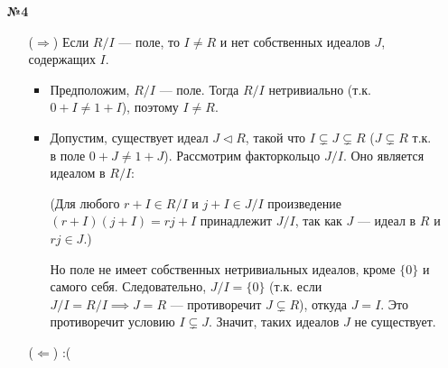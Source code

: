 \documentclass[a4paper]{article}
\begin{document}
\begin{enumerate}
    \item[\textbf{№4}]\begin{enumerate}
        \item[(\(\Rightarrow\))] Если \( R/I \) --- поле, то \( I \neq R \) 
        и нет собственных идеалов \( J \), содержащих \( I \).
        \begin{itemize}
            \item Предположим, \( R/I \) --- поле. 
            Тогда \( R/I \) нетривиально (т.к. $0+I \neq 1 + I$), поэтому \( I \neq R \).
            \item Допустим, существует идеал \( J \triangleleft R \),
            такой что \( I \subsetneq J \subsetneq R \) ($J \subsetneq R$ т.к. в поле $0+J \neq 1 + J$). 
            Рассмотрим факторкольцо \( J/I \). Оно является идеалом в \( R/I \):

            (Для любого \( r + I \in R/I \) и \( j + I \in J/I \) произведение
             \( (r + I)(j + I) = rj + I \) принадлежит \( J/I \), так как \( J \) 
            --- идеал в \( R \) и \( rj \in J \).)
            
            Но поле не имеет собственных нетривиальных идеалов, кроме \(\{0\}\) и самого себя. 
            Следовательно, \( J/I = \{0\} \) (т.к. если \( J/I = R/I \implies J = R \) --- противоречит \( J \subsetneq R \)), откуда \( J = I \). 
            Это противоречит условию \( I \subsetneq J \).
            Значит, таких идеалов \( J \) не существует.
        \end{itemize}

        \item[(\(\Leftarrow\))] :(
    \end{enumerate}
\end{enumerate}
\end{document}
